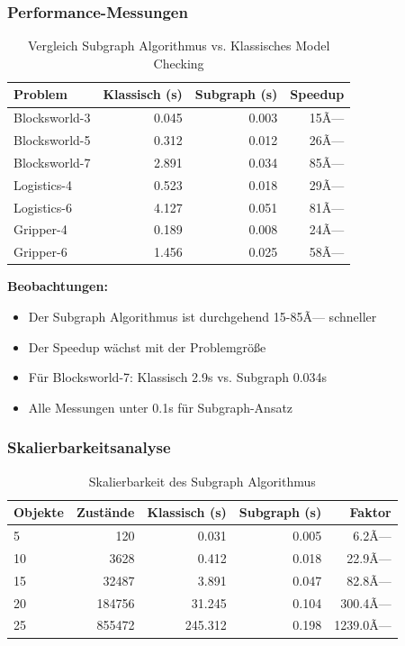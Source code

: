 ﻿\documentclass[a4paper,12pt]{article}
\theoremstyle{definition}
\begin{document}
\subsubsection{Performance-Messungen}

\begin{table}[h]
	\centering
	\caption{Vergleich Subgraph Algorithmus vs. Klassisches Model Checking}
	\label{tab:subgraph_comparison}
	\begin{tabular}{lrrr}
		\toprule
		Problem & Klassisch (s) & Subgraph (s) & Speedup \\
		\midrule
		Blocksworld-3 & 0.045 & 0.003 & 15Ã— \\
		Blocksworld-5 & 0.312 & 0.012 & 26Ã— \\
		Blocksworld-7 & 2.891 & 0.034 & 85Ã— \\
		Logistics-4 & 0.523 & 0.018 & 29Ã— \\
		Logistics-6 & 4.127 & 0.051 & 81Ã— \\
		Gripper-4 & 0.189 & 0.008 & 24Ã— \\
		Gripper-6 & 1.456 & 0.025 & 58Ã— \\
		\bottomrule
	\end{tabular}
\end{table}

\textbf{Beobachtungen:}
\begin{itemize}
	\item[-] Der Subgraph Algorithmus ist durchgehend 15-85Ã— schneller
	\item[-] Der Speedup wächst mit der Problemgröße
	\item[-] Für Blocksworld-7: Klassisch 2.9s vs. Subgraph 0.034s
	\item[-] Alle Messungen unter 0.1s für Subgraph-Ansatz
\end{itemize}

\subsubsection{Skalierbarkeitsanalyse}

\begin{table}[h]
	\centering
	\caption{Skalierbarkeit des Subgraph Algorithmus}
	\label{tab:scalability}
	\begin{tabular}{lrrrr}
		\toprule
		Objekte & Zustände & Klassisch (s) & Subgraph (s) & Faktor \\
		\midrule
		5 & 120 & 0.031 & 0.005 & 6.2Ã— \\
		10 & 3628 & 0.412 & 0.018 & 22.9Ã— \\
		15 & 32487 & 3.891 & 0.047 & 82.8Ã— \\
		20 & 184756 & 31.245 & 0.104 & 300.4Ã— \\
		25 & 855472 & 245.312 & 0.198 & 1239.0Ã— \\
		\bottomrule
	\end{tabular}
\end{table}
\end{document}
